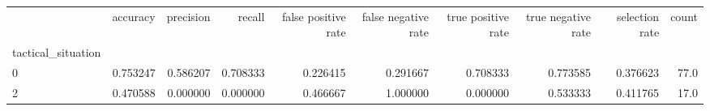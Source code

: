 \begin{tabular}{lrrrrrrrrr}
\toprule
{} &  accuracy &  precision &    recall &  false positive rate &  false negative rate &  true positive rate &  true negative rate &  selection rate &  count \\
tactical\_situation &           &            &           &                      &                      &                     &                     &                 &        \\
\midrule
0                  &  0.753247 &   0.586207 &  0.708333 &             0.226415 &             0.291667 &            0.708333 &            0.773585 &        0.376623 &   77.0 \\
2                  &  0.470588 &   0.000000 &  0.000000 &             0.466667 &             1.000000 &            0.000000 &            0.533333 &        0.411765 &   17.0 \\
\bottomrule
\end{tabular}

